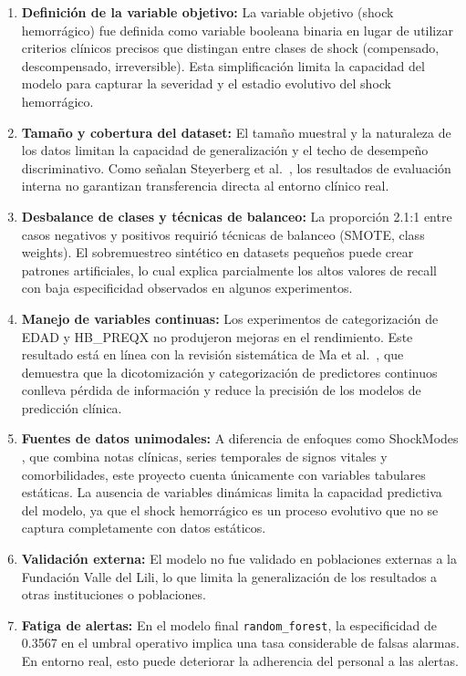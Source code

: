 \begin{enumerate}
    \item \textbf{Definición de la variable objetivo:} La variable objetivo (shock hemorrágico) fue definida como variable booleana binaria en lugar de utilizar criterios clínicos precisos que distingan entre clases de shock (compensado, descompensado, irreversible). Esta simplificación limita la capacidad del modelo para capturar la severidad y el estadio evolutivo del shock hemorrágico.

    \item \textbf{Tamaño y cobertura del dataset:} El tamaño muestral y la naturaleza de los datos limitan la capacidad de generalización y el techo de desempeño discriminativo. Como señalan Steyerberg et al.\ \cite{steyerberg2018}, los resultados de evaluación interna no garantizan transferencia directa al entorno clínico real.

    \item \textbf{Desbalance de clases y técnicas de balanceo:} La proporción 2.1:1 entre casos negativos y positivos requirió técnicas de balanceo (SMOTE, class weights). El sobremuestreo sintético en datasets pequeños puede crear patrones artificiales, lo cual explica parcialmente los altos valores de recall con baja especificidad observados en algunos experimentos.

    \item \textbf{Manejo de variables continuas:} Los experimentos de categorización de EDAD y HB\_PREQX no produjeron mejoras en el rendimiento. Este resultado está en línea con la revisión sistemática de Ma et al.\ \cite{ma2023}, que demuestra que la dicotomización y categorización de predictores continuos conlleva pérdida de información y reduce la precisión de los modelos de predicción clínica.

    \item \textbf{Fuentes de datos unimodales:} A diferencia de enfoques como ShockModes \cite{pal2022}, que combina notas clínicas, series temporales de signos vitales y comorbilidades, este proyecto cuenta únicamente con variables tabulares estáticas. La ausencia de variables dinámicas limita la capacidad predictiva del modelo, ya que el shock hemorrágico es un proceso evolutivo que no se captura completamente con datos estáticos.

    \item \textbf{Validación externa:} El modelo no fue validado en poblaciones externas a la Fundación Valle del Lili, lo que limita la generalización de los resultados a otras instituciones o poblaciones.

    \item \textbf{Fatiga de alertas:} En el modelo final \texttt{random\_forest}, la especificidad de 0.3567 en el umbral operativo implica una tasa considerable de falsas alarmas. En entorno real, esto puede deteriorar la adherencia del personal a las alertas.
\end{enumerate}

\newpage

